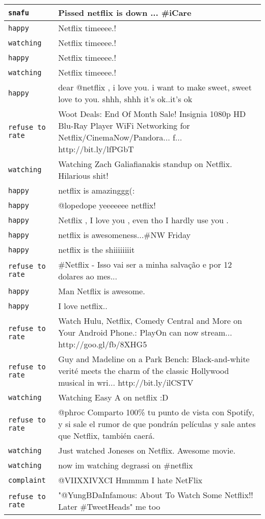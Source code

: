 {\begin{longtable}{|l|p{160mm}|}
      \tabularnewline\hline
         \texttt{snafu} & Pissed netflix is down ... \#iCare
      \tabularnewline\hline
         \texttt{happy} & Netflix timeeee.!
      \tabularnewline\hline
         \texttt{watching} & Netflix timeeee.!
      \tabularnewline\hline
         \texttt{happy} & Netflix timeeee.!
      \tabularnewline\hline
         \texttt{watching} & Netflix timeeee.!
      \tabularnewline\hline
         \texttt{happy} & dear @netflix , i love you. i want to make sweet, sweet love to you. shhh, shhh it's ok..it's ok
      \tabularnewline\hline
         \texttt{refuse to rate} & Woot Deals: End Of Month Sale! Insignia 1080p HD Blu-Ray Player WiFi Networking for Netflix/CinemaNow/Pandora... f... http://bit.ly/lfPGbT
      \tabularnewline\hline
         \texttt{watching} & Watching Zach Galiafianakis standup on Netflix. Hilarious shit!
      \tabularnewline\hline
         \texttt{happy} & netflix is amazinggg(:
      \tabularnewline\hline
         \texttt{happy} & @lopedope yeeeeeee netflix!
      \tabularnewline\hline
         \texttt{happy} & Netflix , I love you , even tho I hardly use you .
      \tabularnewline\hline
         \texttt{happy} & netflix is awesomeness...\#NW Friday
      \tabularnewline\hline
         \texttt{happy} & netflix is the shiiiiiiiit
      \tabularnewline\hline
         \texttt{refuse to rate} & \#Netflix - Isso vai ser a minha salvação e por 12 dolares ao mes...
      \tabularnewline\hline
         \texttt{happy} & Man Netflix is awesome.
      \tabularnewline\hline
         \texttt{happy} & I love netflix..
      \tabularnewline\hline
         \texttt{refuse to rate} & Watch Hulu, Netflix, Comedy Central and More on Your Android Phone.: PlayOn can now stream... http://goo.gl/fb/8XHG5
      \tabularnewline\hline
         \texttt{refuse to rate} & Guy and Madeline on a Park Bench: Black-and-white verité meets the charm of the classic Hollywood musical in wri... http://bit.ly/ilCSTV
      \tabularnewline\hline
         \texttt{watching} & Watching Easy A on netflix :D
      \tabularnewline\hline
         \texttt{refuse to rate} & @phroc Comparto 100\% tu punto de vista con Spotify, y si sale el rumor de que pondrán películas y sale antes que Netflix, también caerá.
      \tabularnewline\hline
         \texttt{watching} & Just watched Joneses on Netflix. Awesome movie.
      \tabularnewline\hline
         \texttt{watching} & now im watching degrassi on \#netflix
      \tabularnewline\hline
         \texttt{complaint} & @VIIXXIVXCI Hmmmm I hate NetFlix
      \tabularnewline\hline
         \texttt{refuse to rate} & "@YungBDaInfamous: About To Watch Some Netflix!! Later \#TweetHeads" me too

\end{longtable}}
